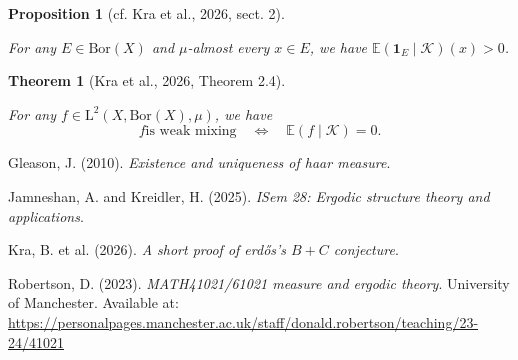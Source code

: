 \documentclass[
  british,
]{article}
\newlength{\cslhangindent}
\newenvironment{CSLReferences}[2] %
 {\begin{list}{}{%
  \setlength{\itemindent}{0pt}
  \setlength{\leftmargin}{0pt}
  \setlength{\parsep}{0pt}
  \ifodd #1
   \setlength{\leftmargin}{\cslhangindent}
   \setlength{\itemindent}{-1\cslhangindent}
  \fi
  \setlength{\itemsep}{#2\baselineskip}}}
 {\end{list}}
\theoremstyle{plain}
\newtheorem{theorem}{Theorem}[section]
\theoremstyle{plain}
\newtheorem{proposition}{Proposition}[section]
\theoremstyle{definition}
\theoremstyle{remark}
\newcommand{\Borel}[1]{{\text{Bor}({#1})}}
\newcommand{\Measure}{{\mu}}
\newcommand{\SigmaAlgebra}[1]{{\mathscr{#1}}}
\newcommand{\EigenAlgebra}{{\SigmaAlgebra{K}}}
\begin{document}
\begin{proposition}[{cf. Kra et al., 2026, sect.
2}]\protect\hypertarget{prp-EigenAlgebraProp}{}\label{prp-EigenAlgebraProp}

For any \(E\in\Borel{X}\) and \(\Measure\)-almost every \(x\in E\), we
have \(\mathbb{E}(\boldsymbol{1}_E\mid\EigenAlgebra)(x)>0\).

\end{proposition}

\begin{theorem}[{Kra et al., 2026, Theorem
2.4}]\protect\hypertarget{thm-WeakMixing}{}\label{thm-WeakMixing}

For any \(f\in\text{L}^2(X,\Borel{X},\Measure)\), we have \[
f\text{is weak mixing}\quad\iff\quad\mathbb{E}(f\mid\EigenAlgebra)=0.
\]

\end{theorem}

\protect{}\label{refs}
\begin{CSLReferences}{1}{0}
Gleason, J. (2010). \emph{Existence and uniqueness of haar measure}.

Jamneshan, A. and Kreidler, H. (2025). \emph{ISem 28: Ergodic structure
theory and applications}.

Kra, B. et al. (2026). \emph{A short proof of erdős's \(B+C\)
conjecture}.

Robertson, D. (2023). \emph{MATH41021/61021 measure and ergodic theory}.
University of Manchester. Available at:
\url{https://personalpages.manchester.ac.uk/staff/donald.robertson/teaching/23-24/41021}

\end{CSLReferences}
\end{document}
